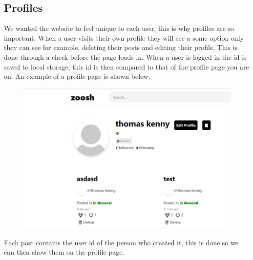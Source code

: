 \subsection{Profiles}
We wanted the website to feel unique to each user, this is why profiles are so important. When a user visits their own profile they will see a some option only they can see for example, deleting their posts and editing their profile. This is done through a check before the page loads in. When a user is logged in the id is saved to local storage, this id is then compared to that of the profile page you are on. An example of a profile page is shown below.
\begin{figure}[H]
  \centering
  \includegraphics[scale=0.4]{img/Profile.PNG}
  \label{fig:Profile}
\end{figure}
Each post contains the user id of the person who created it, this is done so we can then show them on the profile page.


